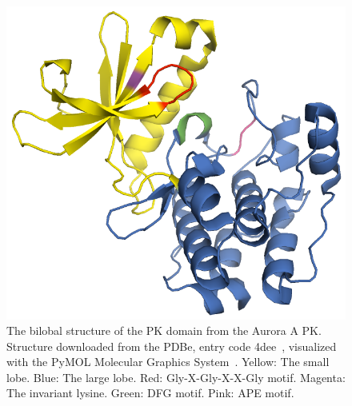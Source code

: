   \begin{figure}
    \centering
    \includegraphics[width=0.8\linewidth]{img/aurora.png}
    \caption{The bilobal structure of the PK domain from the Aurora A PK.
    Structure downloaded from the PDBe, entry code 4dee~\cite{lawrence2012development},
    visualized with the PyMOL Molecular Graphics System~\cite{PyMOL}.
    Yellow: The small lobe.
    Blue: The large lobe.
    Red: Gly-X-Gly-X-X-Gly motif.
    Magenta: The invariant lysine.
    Green: DFG motif.
    Pink: APE motif.
    }
    \label{fig:aurora}
  \end{figure}

